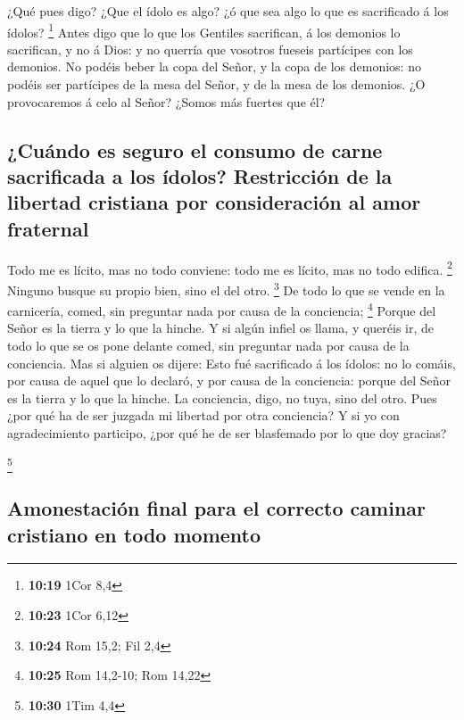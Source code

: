  ¿Qué pues digo? ¿Que el ídolo es algo? ¿ó que sea algo lo
que es sacrificado á los ídolos? \footnote{\textbf{10:19} 1Cor 8,4}
 Antes digo que lo que los Gentiles sacrifican, á los
demonios lo sacrifican, y no á Dios: y no querría que vosotros fueseis
partícipes con los demonios.  No podéis beber la copa del
Señor, y la copa de los demonios: no podéis ser partícipes de la mesa
del Señor, y de la mesa de los demonios.  ¿O provocaremos á
celo al Señor? ¿Somos más fuertes que él?

\hypertarget{cuuxe1ndo-es-seguro-el-consumo-de-carne-sacrificada-a-los-uxeddolos-restricciuxf3n-de-la-libertad-cristiana-por-consideraciuxf3n-al-amor-fraternal}{%
\subsection{¿Cuándo es seguro el consumo de carne sacrificada a los
ídolos? Restricción de la libertad cristiana por consideración al amor
fraternal}\label{cuuxe1ndo-es-seguro-el-consumo-de-carne-sacrificada-a-los-uxeddolos-restricciuxf3n-de-la-libertad-cristiana-por-consideraciuxf3n-al-amor-fraternal}}

 Todo me es lícito, mas no todo conviene: todo me es
lícito, mas no todo edifica. \footnote{\textbf{10:23} 1Cor 6,12}
 Ninguno busque su propio bien, sino el del otro.
\footnote{\textbf{10:24} Rom 15,2; Fil 2,4}  De todo lo que
se vende en la carnicería, comed, sin preguntar nada por causa de la
conciencia; \footnote{\textbf{10:25} Rom 14,2-10; Rom 14,22}
 Porque del Señor es la tierra y lo que la hinche.
 Y si algún infiel os llama, y queréis ir, de todo lo que
se os pone delante comed, sin preguntar nada por causa de la conciencia.
 Mas si alguien os dijere: Esto fué sacrificado á los
ídolos: no lo comáis, por causa de aquel que lo declaró, y por causa de
la conciencia: porque del Señor es la tierra y lo que la hinche.
 La conciencia, digo, no tuya, sino del otro. Pues ¿por qué
ha de ser juzgada mi libertad por otra conciencia?  Y si yo
con agradecimiento participo, ¿por qué he de ser blasfemado por lo que
doy gracias?

\footnote{\textbf{10:30} 1Tim 4,4}

\hypertarget{amonestaciuxf3n-final-para-el-correcto-caminar-cristiano-en-todo-momento}{%
\subsection{Amonestación final para el correcto caminar cristiano en
todo
momento}\label{amonestaciuxf3n-final-para-el-correcto-caminar-cristiano-en-todo-momento}}

